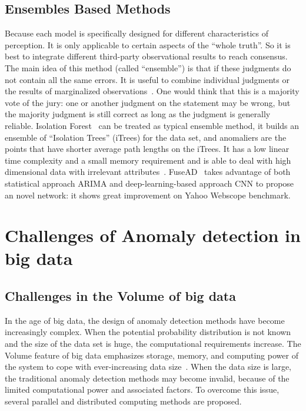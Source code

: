 \subsection{Ensembles Based Methods}

Because each model is specifically designed
for different characteristics of perception.
It is only applicable to certain aspects of
the ``whole truth''.
So it is best to integrate different
third-party observational results to reach consensus.
The main idea of this method (called ``ensemble'')
is that if these judgments do not contain 
all the same errors.
It is useful to combine individual judgments or
the results of marginalized observations~\cite{zhou2012ensemble}.
One would think that this is a majority vote of
the jury:
one or another judgment on the statement may be wrong,
but the majority judgment is still correct as long as
the judgment is generally reliable.
Isolation Forest~\cite{liu2008isolation} 
can be treated as typical ensemble method,
it builds an ensemble of “Isolation Trees” (iTrees) for 
the data set, 
and anomaliers are the points that 
have shorter average path lengths on the iTrees.
It has a low linear time complexity and 
a small memory requirement
and is able to deal with high dimensional data with irrelevant attributes~\cite{chandola2009anomaly}.
FuseAD~\cite{munir2019fusead} 
takes advantage of both statistical approach ARIMA
and deep-learning-based approach
CNN to propose an novel network:
it shows great improvement on Yahoo Webscope benchmark.

\section{Challenges of Anomaly detection in big data}
\label{sec-challenge-big}

\subsection{Challenges in the Volume of big data}

In the age of big data,
the design of anomaly detection methods have become increasingly complex.
When the potential probability distribution is not
known and the size of the data set is huge,
the computational requirements increase.
The Volume feature of big data emphasizes storage,
memory,
and computing power of the system to
cope with ever-increasing data size~\cite{gadepally2014big}.
When the data size is large,
the traditional anomaly detection methods may become invalid,
because of the limited computational power and associated factors.
To overcome this issue,
several parallel and distributed computing methods are proposed.

